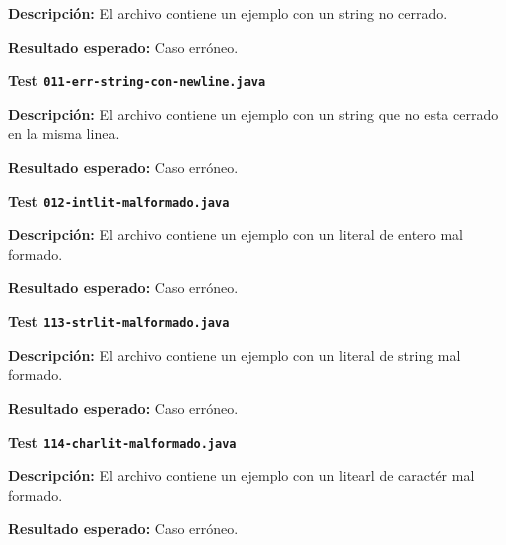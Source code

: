 \documentclass [a4paper,titlepage]{report}
\begin{document}
\textbf{Descripción:} El archivo contiene un ejemplo con un string no
cerrado.

\textbf{Resultado esperado:} Caso erróneo.




\noindent
\textbf{Test \texttt{011-err-string-con-newline.java}}

\textbf{Descripción:} El archivo contiene un ejemplo con un string que
no esta cerrado en la misma linea.

\textbf{Resultado esperado:} Caso erróneo.




\noindent
\textbf{Test \texttt{012-intlit-malformado.java}}

\textbf{Descripción:} El archivo contiene un ejemplo con un literal de 
entero mal formado.

\textbf{Resultado esperado:} Caso erróneo.




\noindent
\textbf{Test \texttt{113-strlit-malformado.java}}

\textbf{Descripción:} El archivo contiene un ejemplo con un literal de
string mal formado.

\textbf{Resultado esperado:} Caso erróneo.




\noindent
\textbf{Test \texttt{114-charlit-malformado.java}}

\textbf{Descripción:} El archivo contiene un ejemplo con un litearl de 
caractér mal formado.

\textbf{Resultado esperado:} Caso erróneo.
\end{document}
